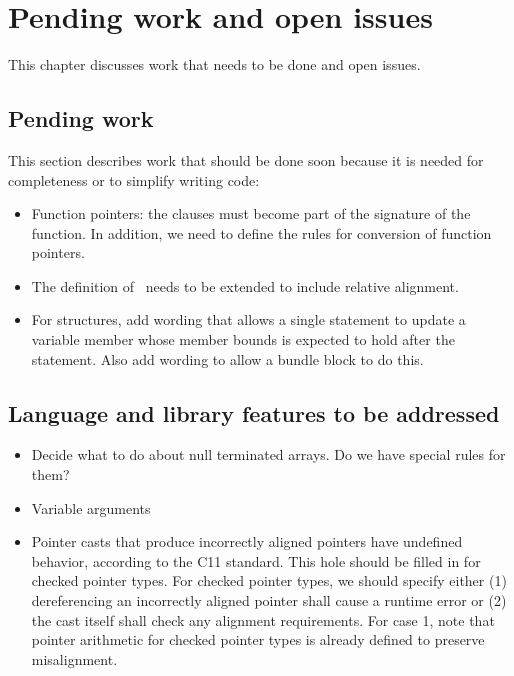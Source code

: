 
\chapter{Pending work and open issues}
\label{chapter:open-issues}

This chapter discusses work that needs to be done and open issues.

\section{Pending work}

This section describes work that should be done soon because it is
needed for completeness or to simplify writing code:
\begin{itemize}
\item
  Function pointers: the  clauses must become part of the signature
  of the function.  In addition, we need to define the 
  rules for conversion of function pointers.
\item The definition of \spanptrT\ needs to be extended to include
      relative alignment.
\item For structures, add wording that allows a single statement  
to update a variable member whose member bounds is expected to hold after
the statement.  Also add wording to allow a bundle block to do this.
\end{itemize}

\section{Language and library features to be addressed}

\begin{itemize}
\item
  Decide what to do about null terminated arrays. Do we have special rules
  for them?
\item
  Variable arguments
\item
  Pointer casts that produce incorrectly aligned pointers have undefined
  behavior, according to the C11 standard. This hole should be filled in
  for checked pointer types. For checked pointer types, we should specify
  either (1) dereferencing an incorrectly aligned pointer shall cause a
  runtime error or (2) the cast itself shall check any alignment
  requirements. For case 1, note that pointer arithmetic for checked pointer types
  is already
  defined to preserve misalignment.
\end{itemize}

